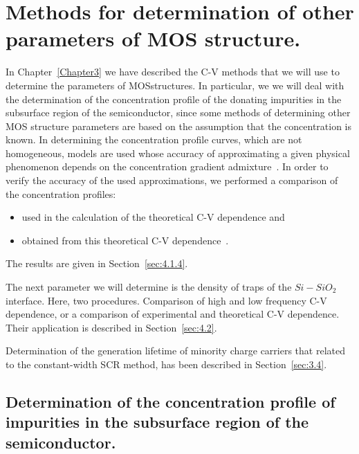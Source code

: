 
\chapter{Methods for determination of other parameters of MOS structure.}\label{Chapter4}

In Chapter~\ref{Chapter3} we have described the C-V methods that we
will use to determine the parameters of MOS\@ structures. In
particular, we we will deal with the determination of the
concentration profile of the donating impurities in the subsurface
region of the semiconductor, since some methods of determining other
MOS structure parameters are based on the assumption that the
concentration is known. In determining the concentration profile
curves, which are not homogeneous, models are used whose accuracy
of approximating a given physical phenomenon depends on the
concentration gradient admixture~\cite{4.1, 4.2, 4.3, 4.4}. In order
to verify the accuracy of the used approximations, we performed a
comparison of the concentration profiles:

\begin{itemize}
\item used in the calculation of the theoretical C-V dependence and
\item obtained from this theoretical C-V dependence~\cite{4.5}.
\end{itemize}

The results are given in Section~\ref{sec:4.1.4}.

\par The next parameter we will determine is the density of traps
of the $Si-SiO_{2}$ interface. Here, two
procedures. Comparison of high and low frequency C-V
dependence, or a comparison of experimental and theoretical C-V
dependence. Their application is described in Section~\ref{sec:4.2}.

\par Determination of the generation lifetime of minority charge carriers that
related to the constant-width SCR method, has been described in Section~\ref{sec:3.4}.

\section[Determination of the concentration profile of impurities]{Determination of the concentration profile of impurities in the subsurface region of the semiconductor.}\label{sec:4.1}

